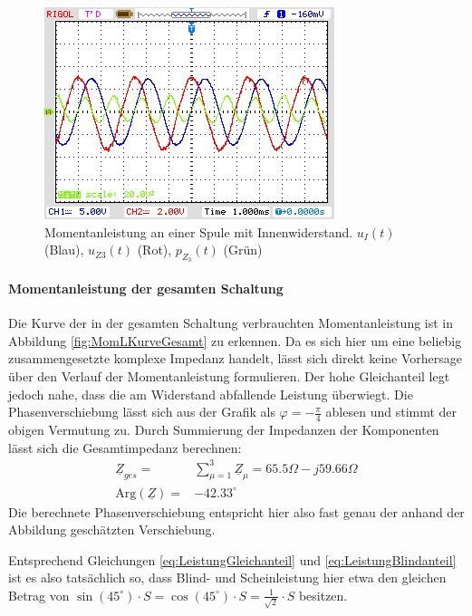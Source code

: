 \begin{figure}[H]
\centering
\includegraphics[width=0.7\linewidth]{Oszi-Bitmaps/NewFile2.jpg}
\caption{Momentanleistung an einer Spule mit Innenwiderstand. $u_I(t)$ (Blau), $u_{Z3}(t)$ (Rot), $p_{Z_3}(t)$ (Grün)}
\label{fig:MomLKurveZ3}
\end{figure}

\paragraph{Momentanleistung der gesamten Schaltung}
Die Kurve der in der gesamten Schaltung verbrauchten Momentanleistung ist in Abbildung \ref{fig:MomLKurveGesamt} zu erkennen. Da es sich hier um eine beliebig zusammengesetzte komplexe Impedanz handelt, lässt sich direkt keine Vorhersage über den Verlauf der Momentanleistung formulieren. Der hohe Gleichanteil legt jedoch nahe, dass die am Widerstand abfallende Leistung überwiegt. Die Phasenverschiebung lässt sich aus der Grafik als $\varphi = -\frac{\pi}{4}$ ablesen und stimmt der obigen Vermutung zu.
Durch Summierung der Impedanzen der Komponenten lässt sich die Gesamtimpedanz berechnen:
\begin{eqnarray}
\underline{Z}_{ges} =& \sum_{\mu=1}^3\underline{Z}_\mu = 65.5\Omega - j59.66\Omega\\
\mbox{Arg}(\underline{Z}) =& -42.33^\circ
\end{eqnarray}
Die berechnete Phasenverschiebung entspricht hier also fast genau der anhand der Abbildung geschätzten Verschiebung.

Entsprechend Gleichungen \eqref{eq:LeistungGleichanteil} und \eqref{eq:LeistungBlindanteil} ist es also tatsächlich so, dass Blind- und Scheinleistung hier etwa den gleichen Betrag von $\sin(45^\circ)\cdot S=\cos(45^\circ)\cdot S = \frac{1}{\sqrt{2}} \cdot S$ besitzen.

